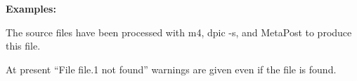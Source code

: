 \documentclass[11pt]{article}
\begin{document}
  \hfill
  {\large\bf Examples:
    
    }
  \hfill\break
  The source files have been processed with m4, dpic -s, and MetaPost to
  produce this file.

  At present ``File file.1 not found'' warnings are given even if the file
  is found.


\end{document}
